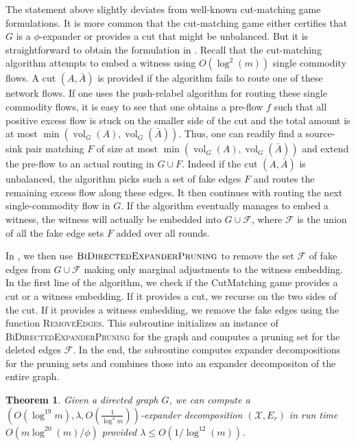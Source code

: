 \documentclass[11pt]{article}
\newtheorem{theorem}{Theorem}[section]
\newcommand\ff{\boldsymbol{\mathit{f}}}
\DeclareMathOperator{\vol}{vol}
\begin{document}
The statement above slightly deviates from well-known cut-matching game formulations. It is more common that the cut-matching game either certifies that $G$ is a $\phi$-expander or provides a cut that might be unbalanced. But it is straightforward to obtain the formulation in . Recall that the cut-matching algorithm attempts to embed a witness using $O(\log^2(m))$ single commodity flows. A cut $(A, \bar{A})$ is provided if the algorithm fails to route one of these network flows. If one uses the push-relabel algorithm for routing these single commodity flows, it is easy to see that one obtains a pre-flow $\ff$ such that all positive excess flow is stuck on the smaller side of the cut and the total amount is at most $\min(\vol_G(A), \vol_G(\bar{A}))$. Thus, one can readily find a source-sink pair matching $F$ of size at most $\min(\vol_G(A), \vol_G(\bar{A}))$ and extend the pre-flow to an actual routing in $G \cup F$. Indeed if the cut $(A, \bar{A})$ is unbalanced, the algorithm picks such a set of fake edges $F$ and routes the remaining excess flow along these edges. It then continues with routing the next single-commodity flow in $G$. If the algorithm eventually manages to embed a witness, the witness will actually be embedded into $G \cup \mathcal{F}$, where $\mathcal{F}$ is the union of all the fake edge sets $F$ added over all rounds. 



In , we then use $\textsc{BiDirectedExpanderPruning}$ to remove the set $\mathcal{F}$ of fake edges from $G \cup \mathcal{F}$ making only marginal adjustments to the witness embedding. In the first line of the algorithm, we check if the CutMatching game provides a cut or a witness embedding. If it provides a cut, we recurse on the two sides of the cut. If it provides a witness embedding, we remove the fake edges using the function \textsc{RemoveEdges}. This subroutine initializes an instance of \textsc{BiDirectedExpanderPruning} for the graph and computes a pruning set for the deleted edges $\mathcal{F}$. In the end, the subroutine computes expander decompositions for the pruning sets and combines those into an expander decompositon of the entire graph.

\begin{theorem}\label{thm:StaticExpanderDecomp}
    Given a directed graph $G$, we can compute a $\left(O(\log^{19} m), \lambda, O\left(\frac{1}{\log^4 m}\right)\right)$-expander decomposition $(\mathcal{X}, E_r)$ in run time $O(m \log^{20}(m)/\phi)$ provided $\lambda \leq O(1/\log^{12}(m))$.
\end{theorem}
\end{document}
